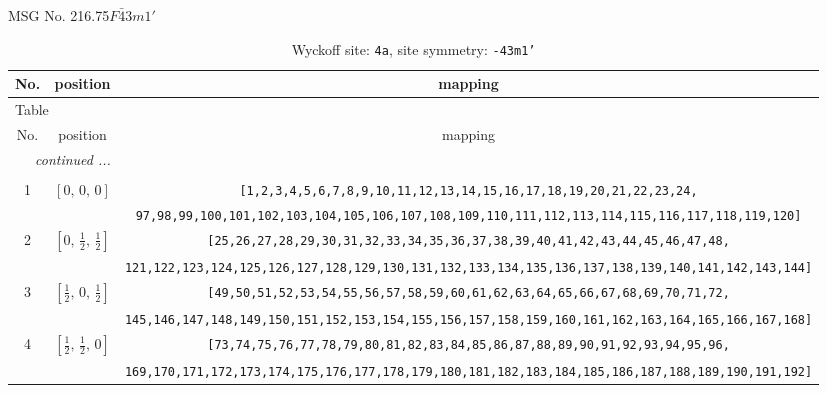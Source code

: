 \documentclass[fleqn,8pt]{jsarticle}
\begin{document}
\setcounter{MaxMatrixCols}{32}

\renewcommand{\tablename}{Table~}
\renewcommand{\figurename}{Figure~}
\begin{center}
\LARGE
MSG No. 216.75\quad$F\bar{4}3m1'$
\end{center}
\renewcommand{\arraystretch}{1.2}
\begin{longtable}{ccc}
\caption{Wyckoff site: {\tt 4a}, site symmetry: {\tt -43m1'}}
 \\
 \hline \hline
No. & position & mapping \\ \hline \endfirsthead

\multicolumn{2}{l}{\tablename\ \thetable{}} \\
 \hline \hline
No. & position & mapping \\ \hline \endhead

 \hline \hline
\multicolumn{2}{r}{\footnotesize\it continued ...} \\ \endfoot

 \hline \hline
\multicolumn{2}{r}{} \\ \endlastfoot

1 & $\left[ 0,\, 0,\, 0 \right]$ & {\tt [1,2,3,4,5,6,7,8,9,10,11,12,13,14,15,16,17,18,19,20,21,22,23,24,} \\ \hline
 &  & {\tt 97,98,99,100,101,102,103,104,105,106,107,108,109,110,111,112,113,114,115,116,117,118,119,120]} \\ \hline
2 & $\left[ 0,\, \frac{1}{2},\, \frac{1}{2} \right]$ & {\tt [25,26,27,28,29,30,31,32,33,34,35,36,37,38,39,40,41,42,43,44,45,46,47,48,} \\ \hline
 &  & {\tt 121,122,123,124,125,126,127,128,129,130,131,132,133,134,135,136,137,138,139,140,141,142,143,144]} \\ \hline
3 & $\left[ \frac{1}{2},\, 0,\, \frac{1}{2} \right]$ & {\tt [49,50,51,52,53,54,55,56,57,58,59,60,61,62,63,64,65,66,67,68,69,70,71,72,} \\ \hline
 &  & {\tt 145,146,147,148,149,150,151,152,153,154,155,156,157,158,159,160,161,162,163,164,165,166,167,168]} \\ \hline
4 & $\left[ \frac{1}{2},\, \frac{1}{2},\, 0 \right]$ & {\tt [73,74,75,76,77,78,79,80,81,82,83,84,85,86,87,88,89,90,91,92,93,94,95,96,} \\ \hline
 &  & {\tt 169,170,171,172,173,174,175,176,177,178,179,180,181,182,183,184,185,186,187,188,189,190,191,192]} \\
\end{longtable}
\renewcommand{\arraystretch}{1.2}
\end{document}
